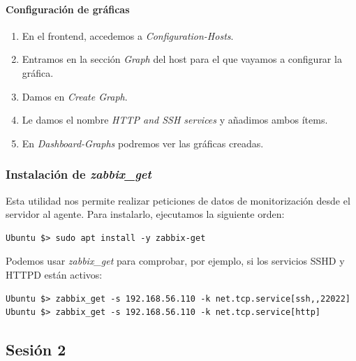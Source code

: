 \documentclass[12pt,spanish]{article}
\begin{document}
\paragraph{Configuración de gráficas}

\begin{enumerate}
  \item En el frontend, accedemos a \textit{Configuration-Hosts}.
  \item Entramos en la sección \textit{Graph} del host para el que vayamos a configurar la gráfica.
  \item Damos en \textit{Create Graph}.
  \item Le damos el nombre \textit{HTTP and SSH services} y añadimos ambos ítems.
  \item En \textit{Dashboard-Graphs} podremos ver las gráficas creadas.
\end{enumerate}


\subsubsection{Instalación de \textit{zabbix\_get}}

Esta utilidad nos permite realizar peticiones de datos de monitorización desde el servidor al agente. Para instalarlo, ejecutamos la siguiente orden:
\begin{lstlisting}
Ubuntu $> sudo apt install -y zabbix-get
\end{lstlisting}

Podemos usar \textit{zabbix\_get} para comprobar, por ejemplo, si los servicios SSHD y HTTPD están activos:

\begin{lstlisting}
Ubuntu $> zabbix_get -s 192.168.56.110 -k net.tcp.service[ssh,,22022]
Ubuntu $> zabbix_get -s 192.168.56.110 -k net.tcp.service[http]
\end{lstlisting}

\subsection{Sesión 2}
\end{document}
